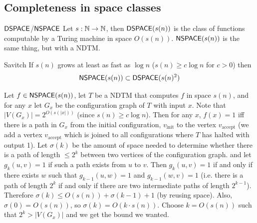 \documentclass{article}
\begin{document}
\subsection{Completeness in space classes}
\begin{fancydefine}{$\mathsf{DSPACE}$/$\mathsf{NSPACE}$}
    Let $s : \mathbb{N} \to \mathbb{N}$, then $\mathsf{DSPACE}(s(n))$ is the class of functions computable by a Turing machine in space $O(s(n))$. $\mathsf{NSPACE}(s(n))$ is the same thing, but with a NDTM.
\end{fancydefine}
\begin{fancythm}{Savitch}
    If $s(n)$ grows at least as fast as $\log n$ ($s(n) \geq c \log n$ for $c>0$) then \[ \mathsf{NSPACE}(s(n)) \subset \mathsf{DSPACE}(s(n)^{2})\]
\end{fancythm}
\proof Let $f \in \mathsf{NSPACE}(s(n))$, let $T$ be a NDTM that computes $f$ in space $s(n)$, and for any $x$ let $G_{x}$ be the configuration graph of $T$ with input $x$. Note that $|V(G_{x})| = 2^{O(s(|x|))}$ (since $s(n)\geq c \log n$). Then for any $x$, $f(x) =1$ iff there is a path in $G_{x}$ from the initial configuration, $v_{\text{init}}$ to the  vertex $v_{\text{accept}}$ (we add a vertex $v_{\text{accept}}$ which is joined to all configurations where $T$ has halted with output 1).\gap 
\newlec 
Let $\sigma(k)$ be the amount of space needed to determine whether there is a path of length $\leq 2^{k}$ between two vertices of the configuration graph. and let $g_{k}(u,v)=1$ if such a path exists from $u$ to $v$. Then $g_{k}(u,v)=1$ if and only if there exists $w$ such that $g_{k-1}(u,w)=1$ and $g_{k-1}(w,v)=1$ (i.e. there is a path of length $2^{k}$ if and only if there are two intermediate paths of length $2^{k-1}$). Therefore $\sigma(k) \leq O(s(n)) + \sigma(k-1)+1$ (by reusing space). Also, $\sigma(0)=O(s(n))$, so $\sigma(k)=O(k\cdot s(n))$. Choose $k=O(s(n))$ such that $2^{k} > |V(G_{x})|$ and we get the bound we wanted. \endproof 
\end{document}
